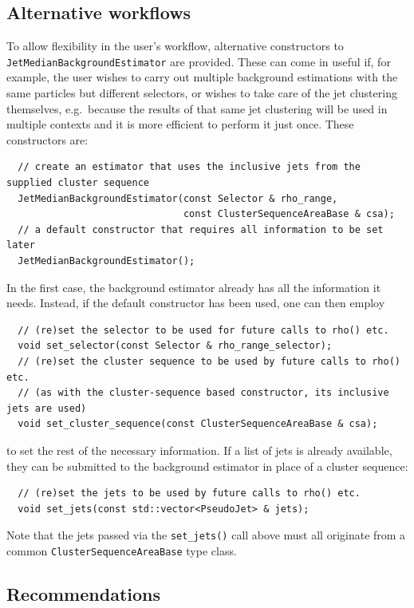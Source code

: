 \documentclass[12pt,a4]{article}
\newcommand{\ttt}[1]{{\small\texttt{#1}}}
\begin{document}
\subsection{Alternative workflows}
%
To allow flexibility in the user's workflow, 
alternative constructors to \ttt{JetMedianBackgroundEstimator} are provided.
%
These can come in useful if, for example, the user wishes to carry out
multiple background estimations with the same particles but different
selectors, or wishes to take care of the jet clustering themselves,
e.g.\ because the results of that same jet clustering will be used in
multiple contexts and it is more efficient to perform it just once. These
constructors are:
\begin{lstlisting}
  // create an estimator that uses the inclusive jets from the supplied cluster sequence
  JetMedianBackgroundEstimator(const Selector & rho_range, 
                               const ClusterSequenceAreaBase & csa);
  // a default constructor that requires all information to be set later
  JetMedianBackgroundEstimator();
\end{lstlisting}
In the first case, the background estimator already has all the information it
needs. Instead, if the default constructor has been used, one can then employ
\begin{lstlisting}
  // (re)set the selector to be used for future calls to rho() etc.
  void set_selector(const Selector & rho_range_selector);
  // (re)set the cluster sequence to be used by future calls to rho() etc. 
  // (as with the cluster-sequence based constructor, its inclusive jets are used)
  void set_cluster_sequence(const ClusterSequenceAreaBase & csa);
\end{lstlisting}
to set the rest of the necessary information. If a list of jets is already
available, they can be submitted to the background estimator in place
of a cluster sequence:
\begin{lstlisting}
  // (re)set the jets to be used by future calls to rho() etc. 
  void set_jets(const std::vector<PseudoJet> & jets);
\end{lstlisting}
Note that the
jets passed via the \ttt{set\_jets()} call above must all originate from a common
\ttt{ClusterSequenceAreaBase} type class.


\subsection{Recommendations}
\end{document}
